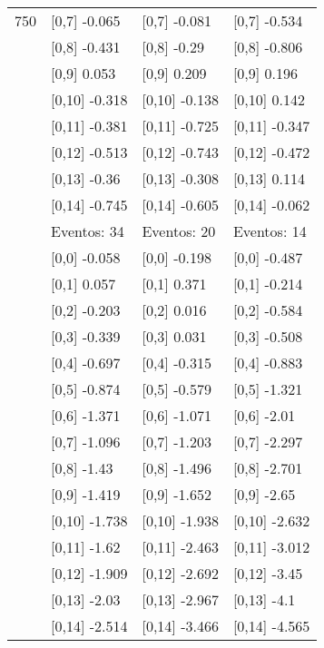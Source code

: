 \begin{table}
\begin{tabular}[t]{llll}
750 & {}[0,7] -0.065 & {}[0,7] -0.081 & {}[0,7] -0.534\\
\addlinespace
 & {}[0,8] -0.431 & {}[0,8] -0.29 & {}[0,8] -0.806\\
 & {}[0,9] 0.053 & {}[0,9] 0.209 & {}[0,9] 0.196\\
 & {}[0,10] -0.318 & {}[0,10] -0.138 & {}[0,10] 0.142\\
 & {}[0,11] -0.381 & {}[0,11] -0.725 & {}[0,11] -0.347\\
 & {}[0,12] -0.513 & {}[0,12] -0.743 & {}[0,12] -0.472\\
\addlinespace
 & {}[0,13] -0.36 & {}[0,13] -0.308 & {}[0,13] 0.114\\
 & {}[0,14] -0.745 & {}[0,14] -0.605 & {}[0,14] -0.062\\
 & Eventos:  34 & Eventos:  20 & Eventos:  14\\
 & {}[0,0] -0.058 & {}[0,0] -0.198 & {}[0,0] -0.487\\
 & {}[0,1] 0.057 & {}[0,1] 0.371 & {}[0,1] -0.214\\
\addlinespace
 & {}[0,2] -0.203 & {}[0,2] 0.016 & {}[0,2] -0.584\\
 & {}[0,3] -0.339 & {}[0,3] 0.031 & {}[0,3] -0.508\\
 & {}[0,4] -0.697 & {}[0,4] -0.315 & {}[0,4] -0.883\\
 & {}[0,5] -0.874 & {}[0,5] -0.579 & {}[0,5] -1.321\\
 & {}[0,6] -1.371 & {}[0,6] -1.071 & {}[0,6] -2.01\\
\addlinespace
1000 & {}[0,7] -1.096 & {}[0,7] -1.203 & {}[0,7] -2.297\\
 & {}[0,8] -1.43 & {}[0,8] -1.496 & {}[0,8] -2.701\\
 & {}[0,9] -1.419 & {}[0,9] -1.652 & {}[0,9] -2.65\\
 & {}[0,10] -1.738 & {}[0,10] -1.938 & {}[0,10] -2.632\\
 & {}[0,11] -1.62 & {}[0,11] -2.463 & {}[0,11] -3.012\\
\addlinespace
 & {}[0,12] -1.909 & {}[0,12] -2.692 & {}[0,12] -3.45\\
 & {}[0,13] -2.03 & {}[0,13] -2.967 & {}[0,13] -4.1\\
 & {}[0,14] -2.514 & {}[0,14] -3.466 & {}[0,14] -4.565\\
\bottomrule
\end{tabular}
\end{table}
